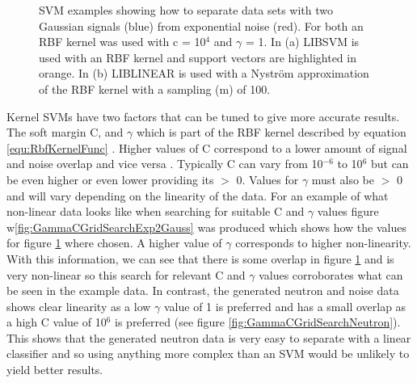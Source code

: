 \begin{figure}[!h]
\begin{subfigure}{.5\textwidth}
  \captionsetup{width=.9\linewidth}
  \caption{}
  \label{subFig:exp_2NysGaussExample}
\end{subfigure}
\caption{SVM examples showing how to separate data sets with two Gaussian signals (blue) from exponential noise (red). For both an RBF kernel was used with c = 10$^4$ and $\gamma$ = 1. In (a) LIBSVM is used with an RBF kernel and support vectors are highlighted in orange. In (b) LIBLINEAR is used with a Nyström approximation of the RBF kernel with a sampling (m) of 100.}
\label{fig:svmExp_GausseExamples}
\end{figure}

Kernel SVMs have two factors that can be tuned to give more accurate results. The soft margin C, and $\gamma$ which is part of the RBF kernel described by equation \ref{equ:RbfKernelFunc} \cite{Boser92atraining}. Higher values of C correspond to a lower amount of signal and noise overlap and vice versa \cite{cortes1995support}. Typically C can vary from 10$^{-6}$ to 10$^6$ but can be even higher or even lower providing its $>$ 0. Values for $\gamma$ must also be $>$ 0 and will vary depending on the linearity of the data. For an example of what non-linear data looks like when searching for suitable C and $\gamma$ values figure w\ref{fig:GammaCGridSearchExp2Gauss} was produced which shows how the values for figure \ref{subFig:exp_2NysGaussExample} where chosen. A higher value of $\gamma$ corresponds to higher non-linearity. With this information, we can see that there is some overlap in figure \ref{subFig:exp_2NysGaussExample} and is very non-linear so this search for relevant C and $\gamma$ values corroborates what can be seen in the example data. In contrast, the generated neutron and noise data shows clear linearity as a low $\gamma$ value of 1 is preferred and has a small overlap as a high C value of 10$^6$ is preferred (see figure \ref{fig:GammaCGridSearchNeutron}). This shows that the generated neutron data is very easy to separate with a linear classifier and so using anything more complex than an SVM would be unlikely to yield better results.

